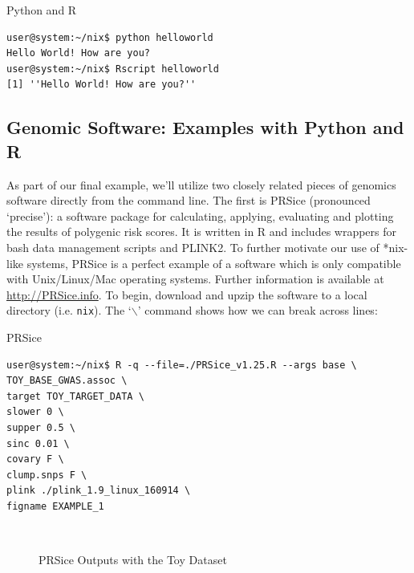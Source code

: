 \documentclass[11pt]{article}
\begin{document}
\begin{listing}[H]
\caption{Python and R}\vspace{-0.1in}
\begin{verbatim}
user@system:~/nix$ python helloworld
Hello World! How are you?
user@system:~/nix$ Rscript helloworld
[1] ''Hello World! How are you?''
\end{verbatim}
\end{listing}

\subsection{Genomic Software: Examples with Python and R}\label{genomicsoftware}

As part of our final example, we'll utilize two closely related pieces of genomics software directly from the command line. The first is PRSice (pronounced ‘precise’): a software package for calculating, applying, evaluating and plotting the results of polygenic risk scores. It is written in R and includes wrappers for bash data management scripts and PLINK2. To further motivate our use of *nix-like systems, PRSice is a perfect example of a software which is only compatible with Unix/Linux/Mac operating systems. Further information is available at \href{http://PRSice.info}{http://PRSice.info}. To begin, download and upzip the software to a local directory (i.e. \texttt{nix}). The `\texttt{$\backslash$}' command shows how we can break across lines:\\

\begin{listing}[H]
\caption{PRSice}\vspace{-0.1in}
\begin{verbatim}
user@system:~/nix$ R -q --file=./PRSice_v1.25.R --args base \
TOY_BASE_GWAS.assoc \
target TOY_TARGET_DATA \
slower 0 \
supper 0.5 \
sinc 0.01 \
covary F \
clump.snps F \
plink ./plink_1.9_linux_160914 \
figname EXAMPLE_1
\end{verbatim}
\end{listing}

\begin{figure}[H]
\centering  
\caption{PRSice Outputs with the Toy Dataset}\label{PRSiceFigure}
\hspace{1in}
\\
\end{figure}
\end{document}
